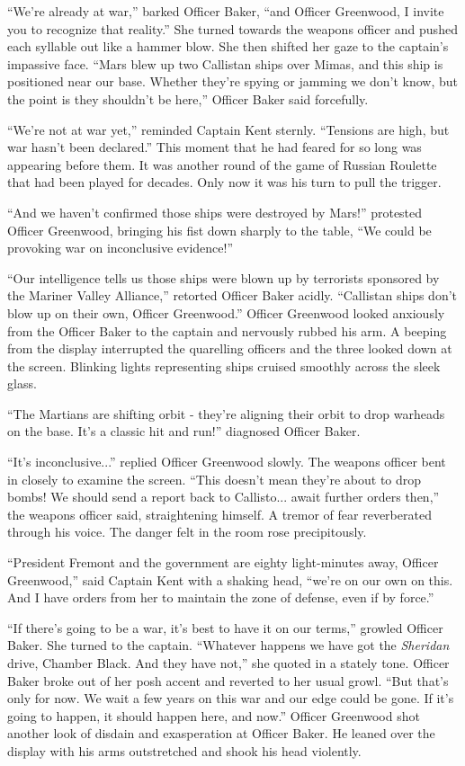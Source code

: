 \documentclass[12pt]{article} %
\begin{document}
``We're already at war,'' barked Officer Baker, ``and Officer Greenwood, I invite you to recognize that reality.'' She turned towards the weapons officer and pushed each syllable out like a hammer blow. She then shifted her gaze to the captain's impassive face. ``Mars blew up two Callistan ships over Mimas, and this ship is positioned near our base. Whether they're spying or jamming we don't know, but the point is they shouldn't be here,'' Officer Baker said forcefully.

``We're not at war yet,'' reminded Captain Kent sternly. ``Tensions are high, but war hasn't been declared.'' This moment that he had feared for so long was appearing before them. It was another round of the game of Russian Roulette that had been played for decades. Only now it was his turn to pull the trigger.

``And we haven't confirmed those ships were destroyed by Mars!'' protested Officer Greenwood,  bringing his fist down sharply to the table, ``We could be provoking war on inconclusive evidence!''

``Our intelligence tells us those ships were blown up by terrorists sponsored by the Mariner Valley Alliance,'' retorted Officer Baker acidly. ``Callistan ships don't blow up on their own, Officer Greenwood.'' Officer Greenwood looked anxiously from the Officer Baker to the captain and nervously rubbed his arm. A beeping from the display interrupted the quarelling officers and the three looked down at the screen. Blinking lights representing ships cruised smoothly across the sleek glass.

``The Martians are shifting orbit - they're aligning their orbit to drop warheads on the base. It's a classic hit and run!'' diagnosed Officer Baker. 

``It's inconclusive...'' replied Officer Greenwood slowly. The weapons officer bent in closely to examine the screen. ``This doesn't mean they're about to drop bombs! We should send a report back to Callisto... await further orders then,'' the weapons officer said, straightening himself. A tremor of fear reverberated through his voice. The danger felt in the room rose precipitously.

``President Fremont and the government are  eighty light-minutes away, Officer Greenwood,'' said Captain Kent with a shaking head, ``we're on our own on this. And I have orders from her to maintain the zone of defense, even if by force.''

``If there's going to be a war, it's best to have it on our terms,'' growled Officer Baker. She turned to the captain. ``Whatever happens we have got the \textit{Sheridan} drive, Chamber Black. And they have not,'' she quoted in a stately tone. Officer Baker broke out of her posh accent and reverted to her usual growl. ``But that's only for now. We wait a few years on this war and our edge could be gone. If it's going to happen, it should happen here, and now.'' Officer Greenwood shot another look of disdain and exasperation at Officer Baker. He leaned over the display with his arms outstretched and shook his head violently.
\end{document}

